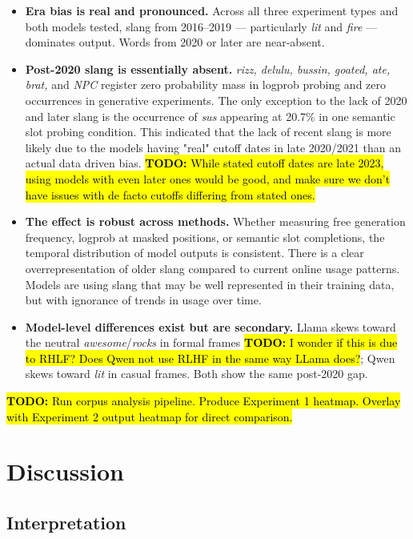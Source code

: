 \documentclass[11pt]{article}
\newcommand{\todo}[1]{\hl{\textbf{TODO:} #1}}
\begin{document}
\begin{itemize}
  \item \textbf{Era bias is real and pronounced.} Across all three experiment types and both models tested, slang from 2016--2019 --- particularly \textit{lit} and \textit{fire} --- dominates output. Words from 2020 or later are near-absent.

  \item \textbf{Post-2020 slang is essentially absent.} \textit{rizz, delulu, bussin, goated, ate, brat,} and \textit{NPC} register zero probability mass in logprob probing and zero occurrences in generative experiments. The only exception to the lack of 2020 and later slang is the occurrence of \textit{sus} appearing at 20.7\% in one semantic slot probing condition. This indicated that the lack of recent slang is more likely due to the models having "real" cutoff dates in late 2020/2021 than an actual data driven bias. \todo{While stated cutoff dates are late 2023, using models with even later ones would be good, and make sure we don't have issues with de facto cutoffs differing from stated ones.}

  \item \textbf{The effect is robust across methods.} Whether measuring free generation frequency, logprob at masked positions, or semantic slot completions, the temporal distribution of model outputs is consistent. There is a clear overrepresentation of older slang compared to current online usage patterns. Models are using slang that may be well represented in their training data, but with ignorance of trends in usage over time.

  \item \textbf{Model-level differences exist but are secondary.} Llama skews toward the neutral \textit{awesome}/\textit{rocks} in formal frames \todo{I wonder if this is due to RHLF? Does Qwen not use RLHF in the same way LLama does?}; Qwen skews toward \textit{lit} in casual frames. Both show the same post-2020 gap.
\end{itemize}

\todo{Run corpus analysis pipeline. Produce Experiment 1 heatmap. Overlay with Experiment 2 output heatmap for direct comparison.}

\section{Discussion}

\subsection{Interpretation}
\end{document}
